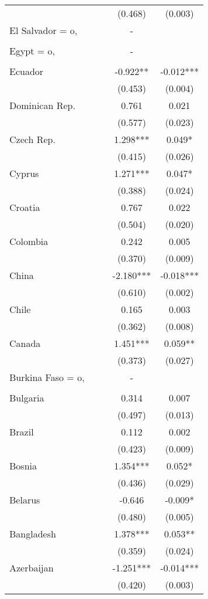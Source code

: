 \documentclass[]{article}
\begin{document}
\begin{tabular}{lcccc}
 &  &  & (0.468) & (0.003) \\
El Salvador = o, &  &  & - &  \\
 &  &  &  &  \\
Egypt = o, &  &  & - &  \\
 &  &  &  &  \\
Ecuador &  &  & -0.922** & -0.012*** \\
 &  &  & (0.453) & (0.004) \\
Dominican Rep. &  &  & 0.761 & 0.021 \\
 &  &  & (0.577) & (0.023) \\
Czech Rep. &  &  & 1.298*** & 0.049* \\
 &  &  & (0.415) & (0.026) \\
Cyprus &  &  & 1.271*** & 0.047* \\
 &  &  & (0.388) & (0.024) \\
Croatia &  &  & 0.767 & 0.022 \\
 &  &  & (0.504) & (0.020) \\
Colombia &  &  & 0.242 & 0.005 \\
 &  &  & (0.370) & (0.009) \\
China &  &  & -2.180*** & -0.018*** \\
 &  &  & (0.610) & (0.002) \\
Chile &  &  & 0.165 & 0.003 \\
 &  &  & (0.362) & (0.008) \\
Canada &  &  & 1.451*** & 0.059** \\
 &  &  & (0.373) & (0.027) \\
Burkina Faso = o, &  &  & - &  \\
 &  &  &  &  \\
Bulgaria &  &  & 0.314 & 0.007 \\
 &  &  & (0.497) & (0.013) \\
Brazil &  &  & 0.112 & 0.002 \\
 &  &  & (0.423) & (0.009) \\
Bosnia &  &  & 1.354*** & 0.052* \\
 &  &  & (0.436) & (0.029) \\
Belarus &  &  & -0.646 & -0.009* \\
 &  &  & (0.480) & (0.005) \\
Bangladesh &  &  & 1.378*** & 0.053** \\
 &  &  & (0.359) & (0.024) \\
Azerbaijan &  &  & -1.251*** & -0.014*** \\
 &  &  & (0.420) & (0.003) \\

\end{tabular}
\end{document}
